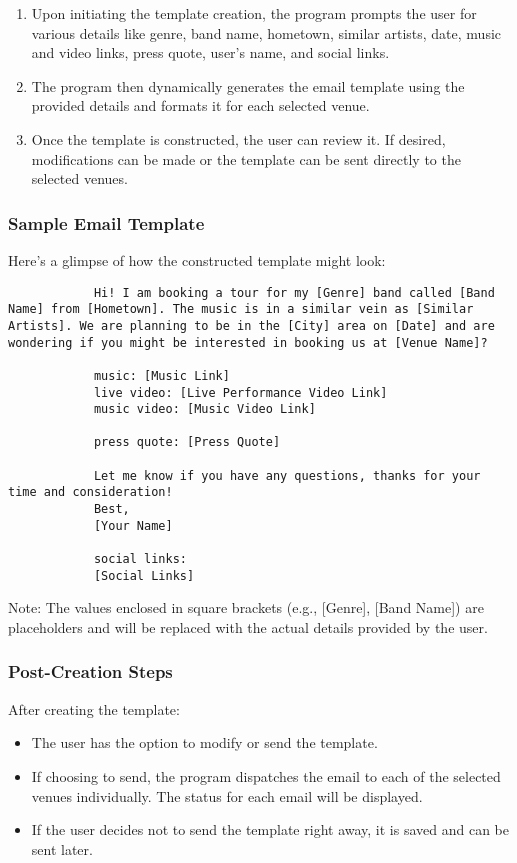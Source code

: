 \documentclass{article}
\begin{document}
	\begin{enumerate}
		\item Upon initiating the template creation, the program prompts the user for various details like genre, band name, hometown, similar artists, date, music and video links, press quote, user's name, and social links.
		\item The program then dynamically generates the email template using the provided details and formats it for each selected venue.
		\item Once the template is constructed, the user can review it. If desired, modifications can be made or the template can be sent directly to the selected venues.
	\end{enumerate}
	
	\subsubsection*{Sample Email Template}
	Here's a glimpse of how the constructed template might look:
	
	\begin{mdframed}[backgroundcolor=background, linecolor=accent]
		\begin{lstlisting}
			Hi! I am booking a tour for my [Genre] band called [Band Name] from [Hometown]. The music is in a similar vein as [Similar Artists]. We are planning to be in the [City] area on [Date] and are wondering if you might be interested in booking us at [Venue Name]?
			
			music: [Music Link]
			live video: [Live Performance Video Link]
			music video: [Music Video Link]
			
			press quote: [Press Quote]
			
			Let me know if you have any questions, thanks for your time and consideration!
			Best,
			[Your Name]
			
			social links:
			[Social Links]
		\end{lstlisting}
	\end{mdframed}
	
	Note: The values enclosed in square brackets (e.g., [Genre], [Band Name]) are placeholders and will be replaced with the actual details provided by the user.
	
	\subsubsection*{Post-Creation Steps}
	After creating the template:
	\begin{itemize}
		\item The user has the option to modify or send the template.
		\item If choosing to send, the program dispatches the email to each of the selected venues individually. The status for each email will be displayed.
		\item If the user decides not to send the template right away, it is saved and can be sent later.
	\end{itemize}
	
\end{document}
